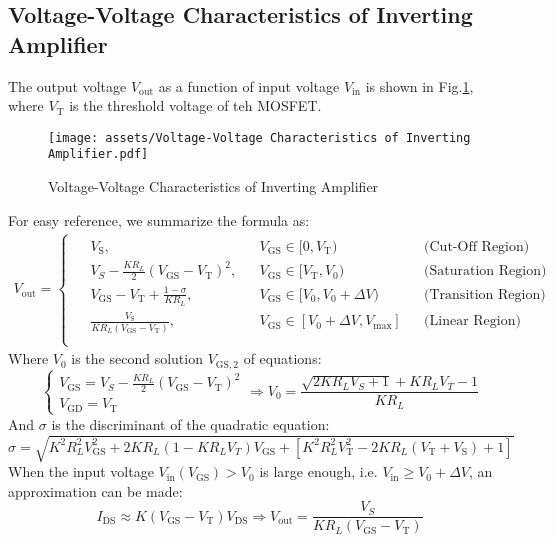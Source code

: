 \documentclass[UTF8]{report}
\theoremstyle{MyLineTheoremStyle} %
\theoremstyle{MyBlockTheoremStyle} %
\theoremstyle{MySubsubsectionStyle} %
\begin{document}
\subsection{Voltage-Voltage Characteristics of Inverting Amplifier}
The output voltage $V_{\text{out}}$ as a function of input voltage $V_\text{in}$ is shown in Fig.\ref{Voltage-Voltage Characteristics}, where $V_\text{T}$ is the threshold voltage of teh MOSFET.
\begin{figure}[H]\centering
    \texttt{[image: assets/Voltage-Voltage Characteristics of Inverting Amplifier.pdf]}
    \caption{Voltage-Voltage Characteristics of Inverting Amplifier}
    \label{Voltage-Voltage Characteristics}
\end{figure}
For easy reference, we summarize the formula as:
\begin{gather}
V_{\text{out}} = 
\begin{cases}
\begin{aligned}
    &V_\text{S}, && V_\text{GS} \in [0, V_\text{T}) && \text{(Cut-Off Region)} \\ 
    &V_S - \frac{KR_L}{2}\left(V_\text{GS} - V_\text{T}\right)^2, && V_\text{GS} \in [V_\text{T}, V_0) &&\text{(Saturation Region)} \\ 
    &V_\text{GS} - V_\text{T} + \frac{1 - \sigma}{KR_L}, && V_\text{GS} \in [V_0, V_0 + \Delta V) &&\text{(Transition Region)} \\ 
    &\frac{V_\text{S}}{KR_L (V_\text{GS} - V_\text{T})},\quad && V_\text{GS} \in [V_0 + \Delta V, V_{\max}] &&\text{(Linear Region)} \\
\end{aligned}
\end{cases}
\end{gather}
Where $V_0$ is the second solution $V_{\text{GS}, 2}$ of equations:
\begin{equation}
\begin{cases}
    V_\text{GS} = V_S - \frac{KR_L}{2}\left(V_\text{GS} - V_\text{T}\right)^2 \\ 
    V_\text{GD} = V_\text{T}
\end{cases}\Longrightarrow 
V_0 = \frac{\sqrt{ 2KR_LV_S + 1 } + KR_L V_T - 1}{K R_L}
\end{equation}
And $\sigma$ is the discriminant of the quadratic equation:
\begin{equation}
\sigma = \sqrt{
K^2R_L^2 V_\text{GS}^2 + 2KR_L\left(1 - KR_L V_T\right) V_\text{GS} + \left[ K^2R_L^2 V_\text{T}^2 - 2KR_L( V_\text{T} + V_\text{S}) + 1\right] 
}
\end{equation}
When the input voltage $V_\text{in} (V_{\text{GS}}) > V_0$ is large enough, i.e. $V_\text{in} \geqslant V_0 + \Delta V$, an approximation can be made:
\begin{equation}
I_\text{DS} \approx K \left(V_\text{GS} - V_\text{T} \right) V_\text{DS} \Longrightarrow V_{\text{out}} = \frac{V_S}{KR_L (V_\text{GS} - V_\text{T})}
\end{equation}
\end{document}
